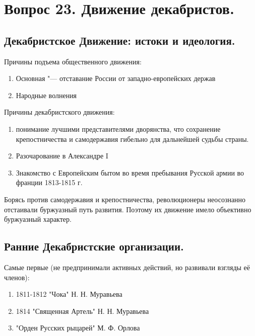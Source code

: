 \section{Вопрос 23. Движение декабристов.}

\subsection{Декабристское Движение: истоки и идеология.}



Причины подъема общественного движения:

\begin{enumerate}
    \item{ Основная "--- отставание России от западно-европейских держав }
    \item{ Народные волнения }
\end{enumerate}

Причины декабристского движения:

\begin{enumerate}
    \item{ понимание лучшими представителями дворянства, что сохранение крепостничества и самодержавия гибельно для дальнейшей судьбы страны. }
    \item{ Разочарование в Александре I }
    \item{ Знакомство с Европейским бытом во время пребывания Русской армии во франции 1813-1815 г. }
\end{enumerate}

Борясь против самодержавия и крепостничества, революционеры неосознанно отстаивали буржуазный путь развития. Поэтому их движение имело объективно буржуазный характер.

\subsection{Ранние Декабристские организации.}

Самые первые (не предпринимали активных действий, но развивали взгляды её членов):

\begin{enumerate}
    \item{1811-1812 "Чока" Н. Н. Муравьева}
    \item{1814 "Священная Артель" Н. Н. Муравьева}
    \item{"Орден Русских рыцарей" М. Ф. Орлова}
\end{enumerate}

